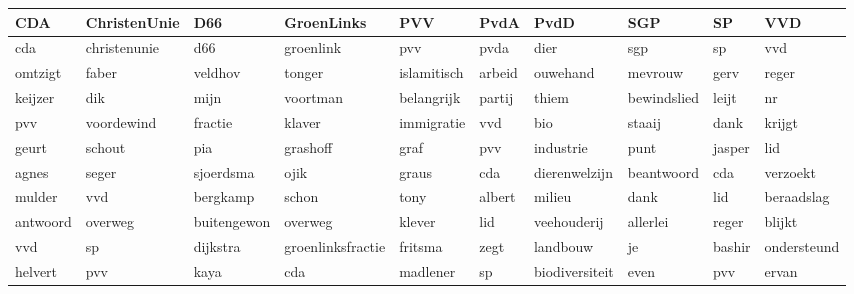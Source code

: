 \begin{tabular}{llllllllll}
\toprule
      CDA &  ChristenUnie &          D66 &         GroenLinks &          PVV &    PvdA &            PvdD &          SGP &      SP &          VVD \\
\midrule
      cda &  christenunie &          d66 &          groenlink &          pvv &    pvda &            dier &          sgp &      sp &          vvd \\
  omtzigt &         faber &      veldhov &             tonger &  islamitisch &  arbeid &        ouwehand &      mevrouw &    gerv &        reger \\
  keijzer &           dik &         mijn &           voortman &   belangrijk &  partij &           thiem &  bewindslied &   leijt &           nr \\
      pvv &    voordewind &      fractie &             klaver &   immigratie &     vvd &             bio &       staaij &    dank &       krijgt \\
    geurt &        schout &          pia &           grashoff &         graf &     pvv &       industrie &         punt &  jasper &          lid \\
    agnes &         seger &    sjoerdsma &               ojik &        graus &     cda &   dierenwelzijn &   beantwoord &     cda &     verzoekt \\
   mulder &           vvd &     bergkamp &              schon &         tony &  albert &          milieu &         dank &     lid &   beraadslag \\
 antwoord &       overweg &  buitengewon &            overweg &       klever &     lid &     veehouderij &     allerlei &   reger &       blijkt \\
      vvd &            sp &     dijkstra &  groenlinksfractie &      fritsma &    zegt &        landbouw &           je &  bashir &  ondersteund \\
  helvert &           pvv &         kaya &                cda &     madlener &      sp &  biodiversiteit &         even &     pvv &        ervan \\
\bottomrule
\end{tabular}
